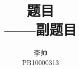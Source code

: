 \documentclass[a4paper]{article}
\title{题目\\ \small ——副题目}
\author{李帅\\PB10000313}
\begin{document}
\maketitle
\tableofcontents
\pagebreak
\listoffigures
\listoftables
\pagebreak
\end{document}
